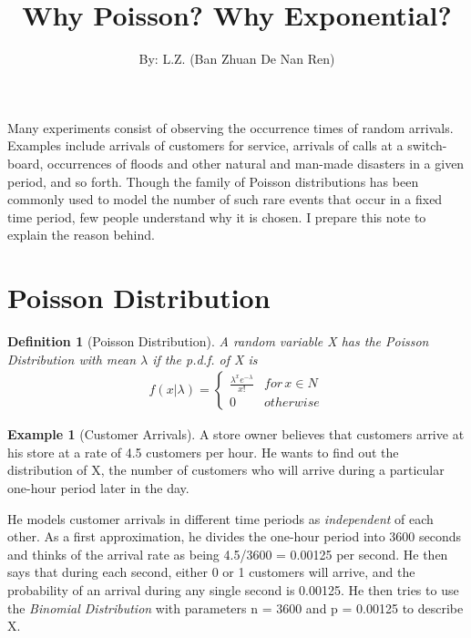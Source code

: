 \documentclass[letterpaper,12pt]{article}
\title{Why Poisson? Why Exponential?}
\author{By: L.Z. (Ban Zhuan De Nan Ren)}
\date{\vspace{-4ex}}
\theoremstyle{plain}
\begin{document}
\maketitle
Many experiments consist of observing the occurrence times of random arrivals. Examples include arrivals of customers for service, arrivals of calls at a switch-board, occurrences of floods and other natural and man-made disasters in a given period, and so forth. Though the family of Poisson distributions has been commonly used to model the number of such rare events that occur in a fixed time period, few people understand why it is chosen. I prepare this note to explain the reason behind.
\section{Poisson Distribution}
\theoremstyle{plain}
\newtheorem{definition}{Definition}
\begin{definition}[Poisson Distribution]
A random variable X has the \textit{Poisson Distribution} with mean $\lambda$ if the p.d.f. of X is 
\begin{equation}
\begin{aligned}
f(x|\lambda)= \left\{\begin{matrix}
\frac{\lambda ^{x}e^{-\lambda}}{x!}& for\, x \in N\\ 
0 &otherwise
\end{matrix}\right.
\label{def:poisson dist}
\end{aligned}
\end{equation}\label{eq:1}
\end{definition}
\vspace{1pt}
\theoremstyle{definition}
\newtheorem{example}{Example}
\begin{example}[Customer Arrivals]\label{ex:1}
A store owner believes that customers arrive at his store at a rate of 4.5 customers per hour. He wants to find out the distribution of X, the number of customers who will arrive during a particular one-hour period later in the day. \end{example}

He models customer arrivals in different time periods as \emph {independent} of each other. As a first approximation, he divides the one-hour period into 3600 seconds and thinks of the arrival rate as being 4.5/3600 = 0.00125 per second. He then says that during each second, either 0 or 1 customers will arrive, and the probability of an arrival during any single second is 0.00125. He then tries to use the \textit{Binomial Distribution} with parameters n = 3600 and p = 0.00125 to describe X.
\end{document}
